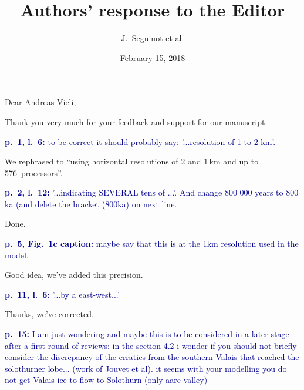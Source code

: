 

\title{Authors' response to the Editor}
\author{J.~Seguinot et al.}
\date{February 15, 2018}


\maketitle
\bigskip


\newcommand{\referee}[2][]{\bigskip\noindent\textcolor{darkblue}{\textbf{#1:} #2}}
\newcommand{\msquote}[1]{\begin{quote}\textit{#1}\end{quote}}
\newcommand{\doi}[1]{doi:\allowbreak\href{http://dx.doi.org/#1}{#1}}

Dear Andreas Vieli,

Thank you very much for your feedback and support for our manuscript.

    \referee[p.~1, l.~6]{%
        to be correct it should probably say: '...resolution of 1 to 2 km'.}

    We rephrased to ``using horizontal resolutions of 2 and 1\,km and up to
    576~processors''.

    \referee[p.~2, l.~12]{%
        '...indicating SEVERAL tens of ...'. And change 800 000 years to 800 ka
        (and delete the bracket (800ka) on next line.}

    Done.

    \referee[p.~5, Fig.~1c caption]{%
        maybe say that this is at the 1km resolution used in the model.}

    Good idea, we've added this precision.

    \referee[p.~11, l.~6]{%
        '...by a east-west...'}

    Thanks, we've corrected.

    \referee[p.~15]{%
        I am just wondering and maybe this is to be considered in a later stage
        after a first round of reviews: in the section 4.2 i wonder if you
        should not briefly consider the discrepancy of the erratics from the
        southern Valais that reached the solothurner lobe... (work of Jouvet et
        al). it seems with your modelling you do not get Valais ice to flow to
        Solothurn (only aare valley)}

